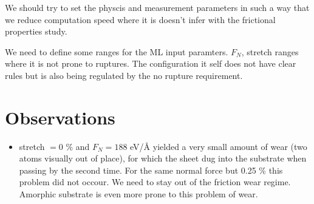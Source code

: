 We should try to set the physcis and measurement parameters in such a way that we reduce computation speed where it is doesn't infer with the frictional properties study.

We need to define some ranges for the ML input paramters. $F_N$, stretch ranges where it is not prone to ruptures. The configuration it self does not have clear rules but is also being regulated by the no rupture requirement. 




\section*{Observations}

\begin{itemize}
  \item stretch $= 0$ \% and $F_N = 188$ eV/Å yielded a very small amount of wear (two atoms visually out of place), for which the sheet dug into the substrate when passing by the second time. For the same normal force but 0.25 \% this problem did not occour. We need to stay out of the friction wear regime. Amorphic substrate is even more prone to this problem of wear.
\end{itemize}
